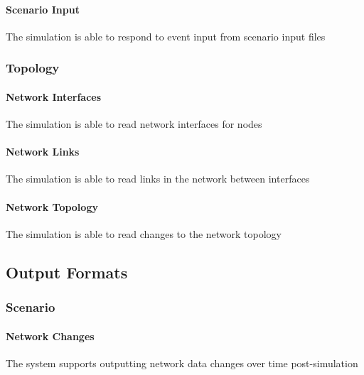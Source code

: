 \documentclass[titlepage]{article}
\begin{document}
	\paragraph{Scenario Input} The simulation is able to respond to event input from scenario input files

\subsubsection{Topology}
    \paragraph{Network Interfaces} The simulation is able to read network interfaces for nodes
    \paragraph{Network Links} The simulation is able to read links in the network between interfaces
    \paragraph{Network Topology} The simulation is able to read changes to the network topology



\subsection{Output Formats%
  \label{output-formats}%
}
\subsubsection{Scenario}
    \paragraph{Network Changes} The system supports outputting network data changes over time post-simulation
\end{document}
